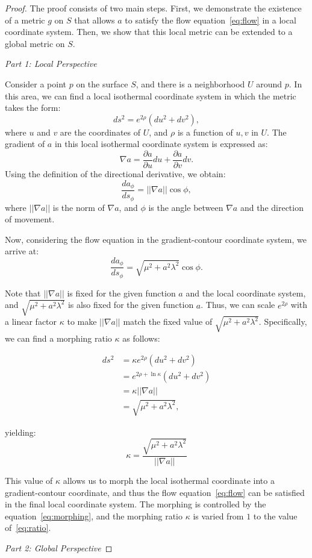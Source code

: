 \begin{proof}
    The proof consists of two main steps. First, we demonstrate the existence of a metric \( g \) on \( S \) that allows \( a \) to satisfy the flow equation~\eqref{eq:flow} in a local coordinate system. Then, we show that this local metric can be extended to a global metric on \( S \).

    \emph{Part 1: Local Perspective}

    Consider a point \( p \) on the surface \( S \), and there is a neighborhood \( U \) around \( p \).
    In this area, we can find a local isothermal coordinate system in which the metric takes the form:
    \[ ds^2 = e^{2\rho}(du^2 + dv^2), \]
    where \( u \) and \( v \) are the coordinates of \( U \), and \( \rho \) is a function of \( u, v \) in \( U \).
    The gradient of \( a \) in this local isothermal coordinate system is expressed as:
    \[ \nabla a = \frac{\partial a}{\partial u} du + \frac{\partial a}{\partial v} dv. \]
    Using the definition of the directional derivative, we obtain:
    \[ \frac{da_{\phi}}{ds_{\phi}} = ||\nabla a|| \cos \phi, \]
    where \( ||\nabla a|| \) is the norm of \( \nabla a \), and \( \phi \) is the angle between \( \nabla a \) and the direction of movement.

    Now, considering the flow equation in the gradient-contour coordinate system, we arrive at:
    \[ \frac{da_{\phi}}{ds_{\phi}} = \sqrt{\mu^2 + a^2 \lambda^2} \cos \phi. \]

    Note that \( ||\nabla a|| \) is fixed for the given function \( a \) and the local coordinate system, and \( \sqrt{\mu^2 + a^2 \lambda^2} \) is also fixed for the given function \( a \). Thus, we can scale \( e^{2\rho} \) with a linear factor \( \kappa \) to make \( ||\nabla a|| \) match the fixed value of \( \sqrt{\mu^2 + a^2 \lambda^2} \). Specifically, we can find a morphing ratio \( \kappa \) as follows:

    \begin{align}
    ds^2 &= \kappa e^{2 \rho}(du^2 + dv^2)\label{eq:morphing} \\
         &= e^{2 \rho + \ln \kappa}(du^2 + dv^2) \\
         &= \kappa ||\nabla a|| \\
         &= \sqrt{\mu^2 + a^2 \lambda^2},
    \end{align}

    yielding:
    \begin{equation}
        \kappa = \frac{\sqrt{\mu^2 + a^2 \lambda^2}}{||\nabla a||}\label{eq:ratio}
    \end{equation}

    This value of \( \kappa \) allows us to morph the local isothermal coordinate into a gradient-contour coordinate,
    and thus the flow equation~\eqref{eq:flow} can be satisfied in the final local coordinate system.
    The morphing is controlled by the equation~\eqref{eq:morphing}, and the morphing ratio \( \kappa \) is varied from $1$ to the value of~\eqref{eq:ratio}.

    \emph{Part 2: Global Perspective}




    \qedhere
\end{proof}

